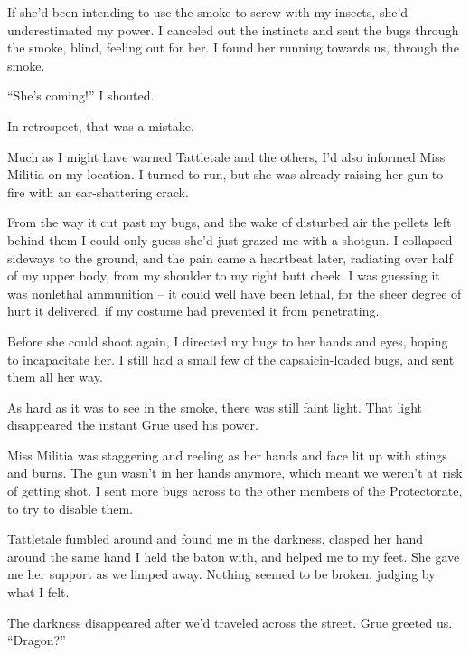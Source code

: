 If she'd been intending to use the smoke to screw with my insects, she'd underestimated my power.  I canceled out the instincts and sent the bugs through the smoke, blind, feeling out for her.  I found her running towards us, through the smoke.



``She's coming!'' I shouted.



In retrospect, that was a mistake.



Much as I might have warned Tattletale and the others, I'd also informed Miss Militia on my location.  I turned to run, but she was already raising her gun to fire with an ear-shattering crack.



From the way it cut past my bugs, and the wake of disturbed air the pellets left behind them I could only guess she'd just grazed me with a shotgun.  I collapsed sideways to the ground, and the pain came a heartbeat later, radiating over half of my upper body, from my shoulder to my right butt cheek.  I was guessing it was nonlethal ammunition – it could well have been lethal, for the sheer degree of hurt it delivered, if my costume had prevented it from penetrating.



Before she could shoot again, I directed my bugs to her hands and eyes, hoping to incapacitate her.  I still had a small few of the capsaicin-loaded bugs, and sent them all her way.



As hard as it was to see in the smoke, there was still faint light.  That light disappeared the instant Grue used his power.



Miss Militia was staggering and reeling as her hands and face lit up with stings and burns.  The gun wasn't in her hands anymore, which meant we weren't at risk of getting shot.  I sent more bugs across to the other members of the Protectorate, to try to disable them.



Tattletale fumbled around and found me in the darkness, clasped her hand around the same hand I held the baton with, and helped me to my feet.  She gave me her support as we limped away.  Nothing seemed to be broken, judging by what I felt.



The darkness disappeared after we'd traveled across the street.  Grue greeted us.  ``Dragon?''



